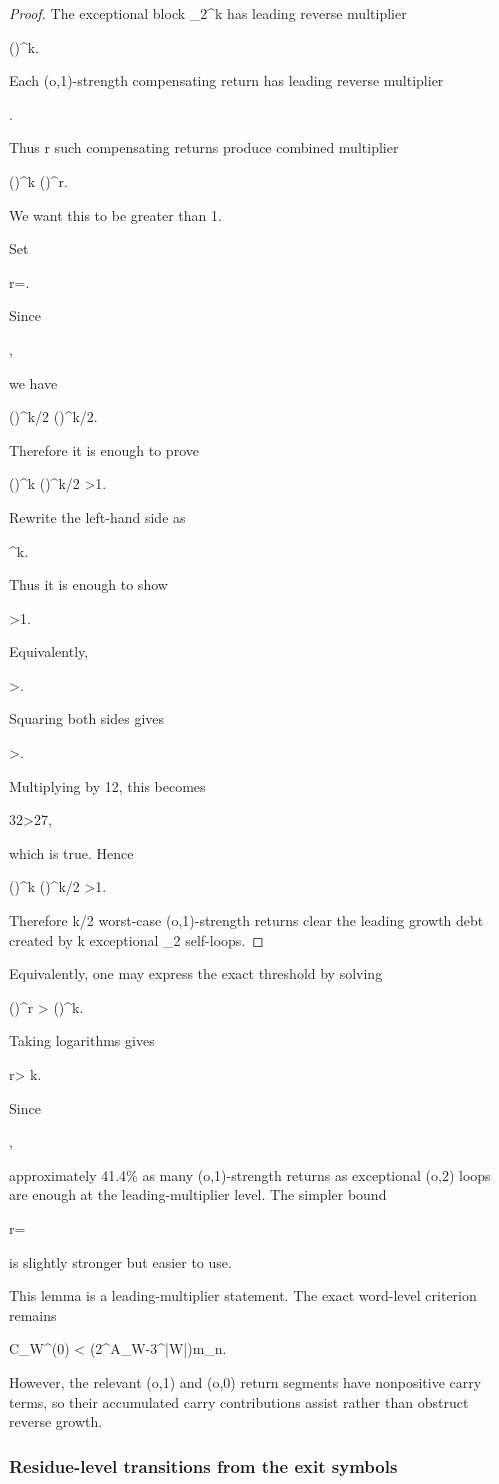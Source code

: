 \documentclass[11pt,letterpaper]{amsart}
\def\({}%
\def\){}%
\def\[{ }%
\def\]{ }%
\theoremstyle{definition}
\theoremstyle{plain}
\theoremstyle{plain}
\theoremstyle{remark}
\begin{document}
\begin{proof}
The exceptional block \(\Omega_2^k\) has leading reverse multiplier
\[
\left(\right)^k.
\]
Each \((o,1)\)-strength compensating return has leading reverse
multiplier
\[
.
\]
Thus \(r\) such compensating returns produce combined multiplier
\[
\left(\right)^k
\left(\right)^r.
\]
We want this to be greater than \(1\).

Set
\[
r=\left\lceil{}\right\rceil.
\]
Since
\[
\left\lceil{}\right\rceil\ge {},
\]
we have
\[
\left(\right)^{\lceil k/2\rceil}
\ge
\left(\right)^{k/2}.
\]
Therefore it is enough to prove
\[
\left(\right)^k
\left(\right)^{k/2}
>1.
\]
Rewrite the left-hand side as
\[
^k.
\]
Thus it is enough to show
\[
>1.
\]
Equivalently,
\[
>.
\]
Squaring both sides gives
\[
>.
\]
Multiplying by \(12\), this becomes
\[
32>27,
\]
which is true.  Hence
\[
\left(\right)^k
\left(\right)^{\lceil k/2\rceil}
>1.
\]
Therefore \(\lceil k/2\rceil\) worst-case \((o,1)\)-strength returns
clear the leading growth debt created by \(k\) exceptional
\(\Omega_2\) self-loops.
\end{proof}

Equivalently, one may express the exact threshold by solving
\[
\left(\right)^r
>
\left(\right)^k.
\]
Taking logarithms gives
\[
r>
k.
\]
Since
\[
,
\]
approximately \(41.4\%\) as many \((o,1)\)-strength returns as
exceptional \((o,2)\) loops are enough at the leading-multiplier level.
The simpler bound
\[
r=\left\lceil{}\right\rceil
\]
is slightly stronger but easier to use.

This lemma is a leading-multiplier statement.  The exact word-level
criterion remains
\[
C_W^{(0)}
<
\left(2^{A_W}-3^{|W|}\right)m_n.
\]
However, the relevant \((o,1)\) and \((o,0)\) return segments have
nonpositive carry terms, so their accumulated carry contributions assist
rather than obstruct reverse growth.


\subsubsection{Residue-level transitions from the exit symbols}
\label{subsubsec:exit-symbol-transition-table}
\end{document}
